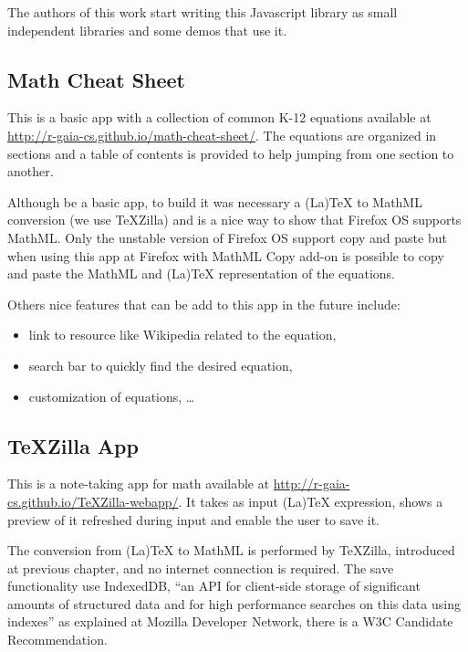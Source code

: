 The authors of this work start writing this Javascript library as small
independent libraries and some demos that use it.

\subsection{Math Cheat Sheet}

This is a basic app with a collection of common K-12 equations available at
\href{http://r-gaia-cs.github.io/math-cheat-sheet/}{http://r-gaia-cs.github.io/math-cheat-sheet/}.
The equations are organized in sections and a table of contents is provided to
help jumping from one section to another.

Although be a basic app, to build it was necessary a (La)TeX to MathML
conversion (we use TeXZilla) and is a nice way to show that Firefox OS supports
MathML. Only the unstable version of Firefox OS support copy and paste but when
using this app at Firefox with MathML Copy add-on is possible to
copy and paste the MathML and (La)TeX representation of the equations.

Others nice features that can be add to this app in the
future include:
\begin{itemize}
  \item link to resource like Wikipedia related to the equation,
  \item search bar to quickly find the desired equation,
  \item customization of equations, \ldots
\end{itemize}

\subsection{TeXZilla App}

This is a note-taking app for math available at
\href{http://r-gaia-cs.github.io/TeXZilla-webapp/}{http://r-gaia-cs.github.io/TeXZilla-webapp/}.
It takes as input (La)TeX expression, shows a preview of it refreshed during
input and enable the user to save it.

The conversion from (La)TeX to MathML is performed by TeXZilla, introduced at
previous chapter, and no internet connection is required. The save functionality
use IndexedDB, ``an API for client-side storage of significant amounts of
structured data and for high performance searches on this data using indexes''
as explained at Mozilla Developer Network, there is a W3C Candidate
Recommendation.


